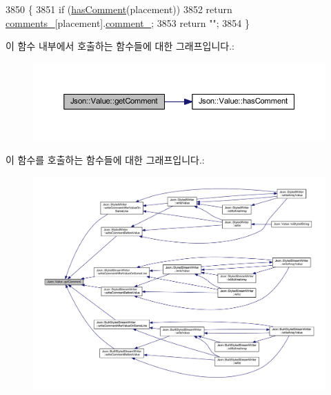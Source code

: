 \begin{DoxyCode}
3850                                                                  \{
3851   \textcolor{keywordflow}{if} (\hyperlink{class_json_1_1_value_a65d8e3ab6a5871cbd019a3e0f0b944a3}{hasComment}(placement))
3852     \textcolor{keywordflow}{return} \hyperlink{class_json_1_1_value_a2016564cabc7a29208e97bd0b782a4e4}{comments\_}[placement].\hyperlink{struct_json_1_1_value_1_1_comment_info_a020f19c7098bab8ec8fec14cd1a5afb9}{comment\_};
3853   \textcolor{keywordflow}{return} \textcolor{stringliteral}{""};
3854 \}
\end{DoxyCode}
이 함수 내부에서 호출하는 함수들에 대한 그래프입니다.\+:\nopagebreak
\begin{figure}[H]
\begin{center}
\leavevmode
\includegraphics[width=350pt]{class_json_1_1_value_a82817229a986f0b254e31d5c83066ffe_cgraph}
\end{center}
\end{figure}
이 함수를 호출하는 함수들에 대한 그래프입니다.\+:\nopagebreak
\begin{figure}[H]
\begin{center}
\leavevmode
\includegraphics[width=350pt]{class_json_1_1_value_a82817229a986f0b254e31d5c83066ffe_icgraph}
\end{center}
\end{figure}
\mbox{\label{class_json_1_1_value_a79d7725dce6260317333e69022367ac9}} 
